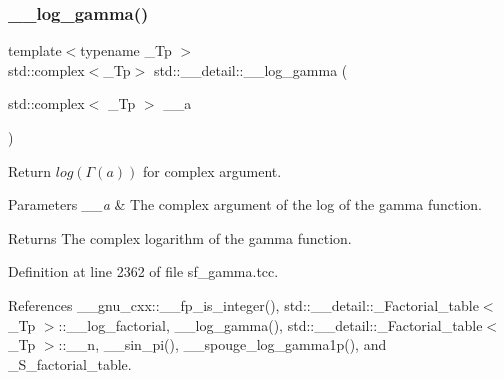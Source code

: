 \mbox{\label{namespacestd_1_1____detail_ad37ad67a4b856eb97b13c8844f9ef8d8}} 
\subsubsection{\texorpdfstring{\+\_\+\+\_\+log\+\_\+gamma()}{\_\_log\_gamma()}\hspace{0.1cm}{\footnotesize\ttfamily [2/2]}}
{\footnotesize\ttfamily template$<$typename \+\_\+\+Tp $>$ \\
std\+::complex$<$\+\_\+\+Tp$>$ std\+::\+\_\+\+\_\+detail\+::\+\_\+\+\_\+log\+\_\+gamma (\begin{DoxyParamCaption}\item[{std\+::complex$<$ \+\_\+\+Tp $>$}]{\+\_\+\+\_\+a }\end{DoxyParamCaption})}



Return $ log(\Gamma(a)) $ for complex argument. 


\begin{DoxyParams}{Parameters}
{\em \+\_\+\+\_\+a} & The complex argument of the log of the gamma function. \\
\hline
\end{DoxyParams}
\begin{DoxyReturn}{Returns}
The complex logarithm of the gamma function. 
\end{DoxyReturn}


Definition at line 2362 of file sf\+\_\+gamma.\+tcc.



References \+\_\+\+\_\+gnu\+\_\+cxx\+::\+\_\+\+\_\+fp\+\_\+is\+\_\+integer(), std\+::\+\_\+\+\_\+detail\+::\+\_\+\+Factorial\+\_\+table$<$ \+\_\+\+Tp $>$\+::\+\_\+\+\_\+log\+\_\+factorial, \+\_\+\+\_\+log\+\_\+gamma(), std\+::\+\_\+\+\_\+detail\+::\+\_\+\+Factorial\+\_\+table$<$ \+\_\+\+Tp $>$\+::\+\_\+\+\_\+n, \+\_\+\+\_\+sin\+\_\+pi(), \+\_\+\+\_\+spouge\+\_\+log\+\_\+gamma1p(), and \+\_\+\+S\+\_\+factorial\+\_\+table.

\mbox{\label{namespacestd_1_1____detail_ac13e31ebcd3c99d6a7cad9010e039315}} 
